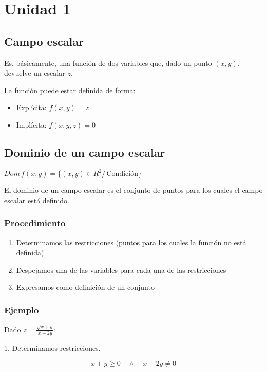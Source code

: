 \section{Unidad 1}

\subsection{Campo escalar}

Es, básicamente, una función de dos variables que,
dado un punto \((x,y)\),
devuelve un escalar \(z\).

La función puede estar definida de forma:
\begin{itemize}
    \item Explícita: \(f(x,y) = z\)
    \item Implícita: \(f(x,y,z) = 0\)
\end{itemize}

\subsection{Dominio de un campo escalar}

\(Dom \, f(x,y) = \{(x,y) \in R^{2} / \, \text{Condición}\}\)

El dominio de un campo escalar es el conjunto de puntos para los cuales el campo 
escalar está definido.

\subsubsection{Procedimiento}

\begin{enumerate}
    \item Determinamos las restricciones (puntos para los cuales la función
    no está definida)
    \item Despejamos una de las variables para cada una de las restricciones
    \item Expresamos como definición de un conjunto
\end{enumerate}

\subsubsection{Ejemplo}

Dado \(z = \frac{\sqrt{x+y}}{x-2y}\):

1. Determinamos restricciones.

\begin{equation*}
    x+y \geq 0 \quad \land \quad x-2y \neq 0
\end{equation*}

